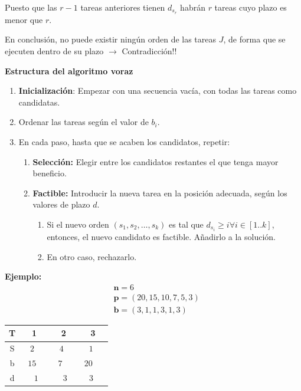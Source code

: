 \documentclass[10pt,a4paper,spanish]{report}
\theoremstyle{definition}
\theoremstyle{remark}
\begin{document}
Puesto que las $r-1$ tareas anteriores tienen $d_{s_r}$ habrán $r$ tareas cuyo plazo es menor que $r$.

En conclusión, no puede existir ningún orden de las tareas $J$, de forma que se ejecuten dentro de su plazo $\rightarrow$ Contradicción!!

\textbf{Estructura del algoritmo voraz}

\begin{enumerate}[---]
    \item \textbf{Inicialización}: Empezar con una secuencia vacía, con todas las tareas como candidatas.
    \item Ordenar las tareas según el valor de $b_i$.
    \item En cada paso, hasta que se acaben los candidatos, repetir:
    \begin{enumerate}[$\bullet$]
        \item \textbf{Selección:} Elegir entre los candidatos restantes el que tenga mayor beneficio.
        \item \textbf{Factible:} Introducir la nueva tarea en la posición adecuada, según los valores de plazo $d$.
            \begin{enumerate}[$\bullet$]
                \item Si el nuevo orden $(s_1,s_2, \ldots, s_k)$ es tal que $d_{s_i} \ge i \forall i \in [1..k]$, entonces, el nuevo candidato es factible. Añadirlo a la solución.
                \item En otro caso, rechazarlo.
            \end{enumerate}
    \end{enumerate}
\end{enumerate}

\textbf{Ejemplo:}
\begin{align*}
    &\mathbf{n} = 6\\
    &\mathbf{p}=(20,15,10,7,5,3)\\
    &\mathbf{b}=(3,1,1,3,1,3)
 \end{align*} 
 \begin{center}
    \begin{tabular}{|c|c|c|c|}
        \hline
        \rowcolor[rgb]{0.8,0.8,0.8}T & 1 & 2 & 3 \\
        \hline
        \cellcolor[rgb]{0.8,0.8,0.8}S & ~$2$~~ & ~$4$~~ & ~$1$~~\\
        \hline
        \cellcolor[rgb]{0.9,0.9,0.9}b & \multicolumn{3}{c|}{~$15$ ~~~~ $7$ ~~~~ $20$ ~~}\\
        \hline
        \cellcolor[rgb]{0.9,0.9,0.9}d & \multicolumn{3}{c|}{$1$ ~~~ ~ $3$ ~~~~ $3$ }\\
        \hline
    \end{tabular}
\end{center}
\end{document}
